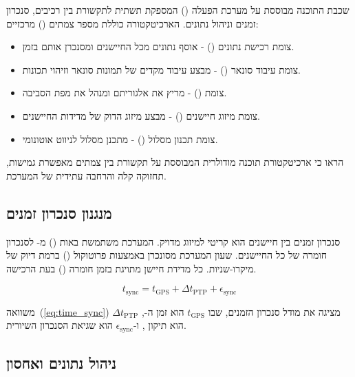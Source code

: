 שכבת התוכנה מבוססת על מערכת הפעלה  () המספקת תשתית לתקשורת בין רכיבים, סנכרון זמנים וניהול נתונים. הארכיטקטורה כוללת מספר צמתים () מרכזיים:

\begin{itemize}
    \item צומת רכישת נתונים () - אוסף נתונים מכל החיישנים ומסנכרן אותם בזמן.
    \item צומת עיבוד סונאר () - מבצע עיבוד מקדים של תמונות סונאר וזיהוי תכונות.
    \item צומת  () - מריץ את אלגוריתם  ומנהל את מפת הסביבה.
    \item צומת מיזוג חיישנים () - מבצע מיזוג הדוק של מדידות החיישנים.
    \item צומת תכנון מסלול () - מתכנן מסלול לניווט אוטונומי.
\end{itemize}

\citet{Thrun2005ProbRobotics} הראו כי ארכיטקטורת תוכנה מודולרית המבוססת על תקשורת בין צמתים מאפשרת גמישות, תחזוקה קלה והרחבה עתידית של המערכת.

\subsection{מנגנון סנכרון זמנים}
\label{sec:time_sync}

סנכרון זמנים בין חיישנים הוא קריטי למיזוג מדויק. המערכת משתמשת באות  () מ- לסנכרון חומרה של כל החיישנים. שעון המערכת מסונכרן באמצעות פרוטוקול  () ברמת דיוק של מיקרו-שניות. כל מדידת חיישן מתויגת בזמן חומרה () בעת הרכישה.

\begin{equation}
t_{\text{sync}} = t_{\text{GPS}} + \Delta t_{\text{PTP}} + \epsilon_{\text{sync}}
\label{eq:time_sync}
\end{equation}

משוואה~(\ref{eq:time_sync}) מציגה את מודל סנכרון הזמנים, שבו $t_{\text{GPS}}$ הוא זמן ה-, $\Delta t_{\text{PTP}}$ הוא תיקון , ו-$\epsilon_{\text{sync}}$ הוא שגיאת הסנכרון השיורית.

\subsection{ניהול נתונים ואחסון}
\label{sec:data_management}


